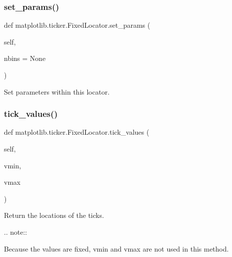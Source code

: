 \mbox{\label{classmatplotlib_1_1ticker_1_1FixedLocator_ae52e2dfe1759fd53886d03a69421b9d2}} 
\subsubsection{\texorpdfstring{set\+\_\+params()}{set\_params()}}
{\footnotesize\ttfamily def matplotlib.\+ticker.\+Fixed\+Locator.\+set\+\_\+params (\begin{DoxyParamCaption}\item[{}]{self,  }\item[{}]{nbins = {\ttfamily None} }\end{DoxyParamCaption})}

\begin{DoxyVerb}Set parameters within this locator.\end{DoxyVerb}
 \mbox{\label{classmatplotlib_1_1ticker_1_1FixedLocator_a4190bcd5b00734d380b6e8fef61a5fbf}} 
\subsubsection{\texorpdfstring{tick\+\_\+values()}{tick\_values()}}
{\footnotesize\ttfamily def matplotlib.\+ticker.\+Fixed\+Locator.\+tick\+\_\+values (\begin{DoxyParamCaption}\item[{}]{self,  }\item[{}]{vmin,  }\item[{}]{vmax }\end{DoxyParamCaption})}

\begin{DoxyVerb}Return the locations of the ticks.

.. note::

    Because the values are fixed, vmin and vmax are not used in this
    method.\end{DoxyVerb}
 


